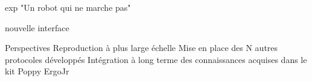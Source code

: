 
exp "Un robot qui ne marche pas"%

nouvelle interface



Perspectives
Reproduction à plus large échelle
Mise en place des N autres protocoles développés
Intégration à long terme des connaissances acquises dans le kit Poppy ErgoJr 


\begin{comment}
\section{\textit{Exp}: “Un robot qui ne marche pas”}
    \subsection{Impact sur la motivation}
    \subsection{Impact sur l'apprentissage}
    \subsection{Impact sur l'acceptabilité}
\end{comment}